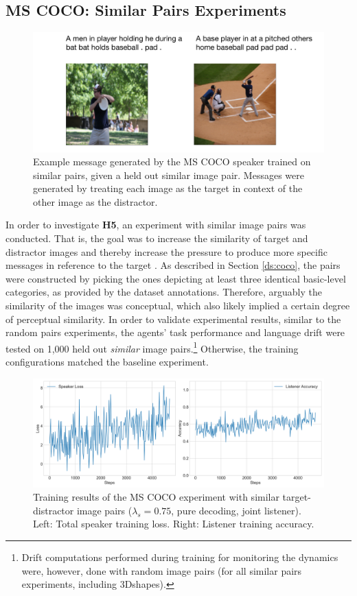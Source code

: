 \subsection{MS COCO: Similar Pairs Experiments}
\label{expt:coco_similar_pairs}

\begin{figure}[h]
	\centering
	\includegraphics[width=0.8\linewidth]{images/example_generations/coco_speakers_SimilarPairs_example_cropped.pdf}
	\caption{Example message generated by the MS COCO speaker trained on similar pairs, given a held out similar image pair. Messages were generated by treating each image as the target in context of the other image as the distractor.}
	\label{fig:coco_similarPairs_speaker_generation}
\end{figure}
In order to investigate \textbf{H5}, an experiment with similar image pairs was conducted. That is, the goal was to increase the similarity of target and distractor images and thereby increase the pressure to produce more specific messages in reference to the target \parencite[cf.][]{graf2016animal}. As described in Section \ref{ds:coco}, the pairs were constructed by picking the ones depicting at least three identical basic-level categories, as provided by the dataset annotations. Therefore, arguably the similarity of the images was conceptual, which also likely implied a certain degree of perceptual similarity. In order to validate experimental results, similar to the random pairs experiments, the agents' task performance and language drift were tested on 1,000 held out \emph{similar} image pairs.\footnote{Drift computations performed during training for monitoring the dynamics were, however, done with random image pairs (for all similar pairs experiments, including 3Dshapes).}
Otherwise, the training configurations matched the baseline experiment. 

\begin{figure}[h]
	\centering
	\includegraphics[width=\linewidth]{images/coco_similarFixed_075_losses.png}
	\caption{Training results of the MS COCO experiment with similar target-distractor image pairs ($\lambda_s=0.75$, pure decoding, joint listener). Left: Total speaker training loss. Right: Listener training accuracy.}
	\label{fig:coco_similar_speaker_loss_listener_acc_all}
\end{figure}

